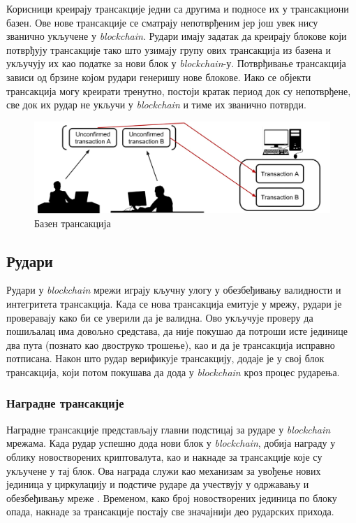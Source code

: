 \documentclass[12pt, a4paper]{article}
\begin{document}
Корисници креирају трансакције једни са другима и подносе их у трансакциони базен. Ове нове трансакције се сматрају непотврђеним јер још увек нису званично укључене у \textit{blockchain}. Рудари имају задатак да креирају блокове који потврђују трансакције тако што узимају групу ових трансакција из базена и укључују их као податке за нови блок у \textit{blockchain}-у. Потврђивање трансакција зависи од брзине којом рудари генеришу нове блокове. Иако се објекти трансакција могу креирати тренутно, постоји кратак период док су непотврђене, све док их рудар не укључи у \textit{blockchain} и тиме их званично потврди.

\begin{figure}[h]
    \centering
    \includegraphics[width=1\linewidth]{slike/transaction-pool.png}
    \caption{Базен трансакција}
    \label{fig:transaction-pool}
\end{figure}

\subsection{Рудари}
Рудари у \textit{blockchain} мрежи играју кључну улогу у обезбеђивању валидности и интегритета трансакција. Када се нова трансакција емитује у мрежу, рудари је проверавају како би се уверили да је валидна. Ово укључује проверу да пошиљалац има довољно средстава, да није покушао да потроши исте јединице два пута (познато као двоструко трошење), као и да је трансакција исправно потписана. Након што рудар верификује трансакцију, додаје је у свој блок трансакција, који потом покушава да дода у \textit{blockchain} кроз процес рударења.

\newpage
\subsubsection{Наградне трансакције}
Наградне трансакције представљају главни подстицај за рударе у \textit{blockchain} мрежама. Када рудар успешно дода нови блок у \textit{blockchain}, добија награду у облику новостворених криптовалута, као и накнаде за трансакције које су укључене у тај блок. Ова награда служи као механизам за увођење нових јединица у циркулацију и подстиче рударе да учествују у одржавању и обезбеђивању мреже \cite{13}. Временом, како број новостворених јединица по блоку опада, накнаде за трансакције постају све значајнији део рударских прихода.
\end{document}
